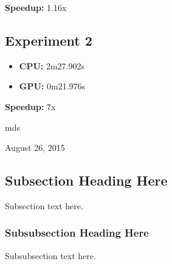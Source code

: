 \documentclass[conference]{IEEEtran}
\begin{document}
\textbf{Speedup:} 1.16x

\subsection{Experiment 2}

\begin{itemize}
    \item \textbf{CPU:} 2m27.902s
    \item \textbf{GPU:} 0m21.976s
\end{itemize}

\textbf{Speedup:} 7x


\hfill mds
 
\hfill August 26, 2015

\subsection{Subsection Heading Here}
Subsection text here.


\subsubsection{Subsubsection Heading Here}
Subsubsection text here.


%
%

\end{document}
